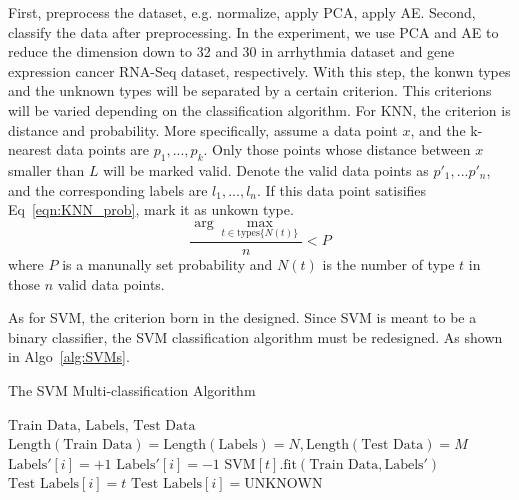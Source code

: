 \documentclass[twocolumn,10pt]{article}
\begin{document}
  First, preprocess the dataset, e.g. normalize, apply PCA, apply AE. Second, classify the data after preprocessing. 
  In the experiment, we use PCA and AE to reduce the dimension down to 32 and 30 in arrhythmia dataset and gene 
  expression cancer RNA-Seq dataset, respectively. 
  With this step, the konwn types and the unknown types will be separated by a certain criterion. This criterions will 
  be varied depending on the classification algorithm. For KNN, the criterion is distance and probability. More specifically, 
  assume a data point $x$, and the k-nearest data points are $p_1,...,p_k$. Only those points whose distance between 
  $x$ smaller than $L$ will be marked valid. Denote the valid data points as $p'_1,...p'_n$, and the corresponding 
  labels are $l_1,...,l_n$. If this data point satisifies Eq~\ref{eqn:KNN_prob}, mark it as unkown type.
  \begin{equation}
    \label{eqn:KNN_prob}
    \frac{\arg\max_{t\in\text{types}\{N(t)\}}}{n}<P
  \end{equation}
  where $P$ is a manunally set probability and $N(t)$ is the number of type $t$ in those $n$ valid data points.
  
  As for SVM, the criterion born in the designed. Since SVM is meant to be a binary classifier, the SVM classification 
  algorithm must be redesigned. As shown in Algo~\ref{alg:SVMs}. 
  \begin{algorithm}[h]
    \caption{The SVM Multi-classification Algorithm}\label{alg:SVMs}
    \begin{algorithmic}[1]
      \Require $\text{Train Data, Labels, Test Data}$
      \Assume $\text{Length}(\text{Train Data})=\text{Length}(\text{Labels})=N,\text{Length}(\text{Test Data})=M$
            \State $\text{Labels}'[i] = +1$
          \Else
            \State $\text{Labels}'[i] = -1$
          \EndIf
        \EndFor
        \State $\text{SVM}[t].\text{fit}(\text{Train Data}, \text{Labels}')$
      \EndFor
            \State $\text{Test Labels}[i] = t$
          \Else
            \State $\text{Test Labels}[i] = \text{UNKNOWN}$
          \EndIf
        \EndFor
      \EndFor
    \end{algorithmic}
  \end{algorithm}
\end{document}

